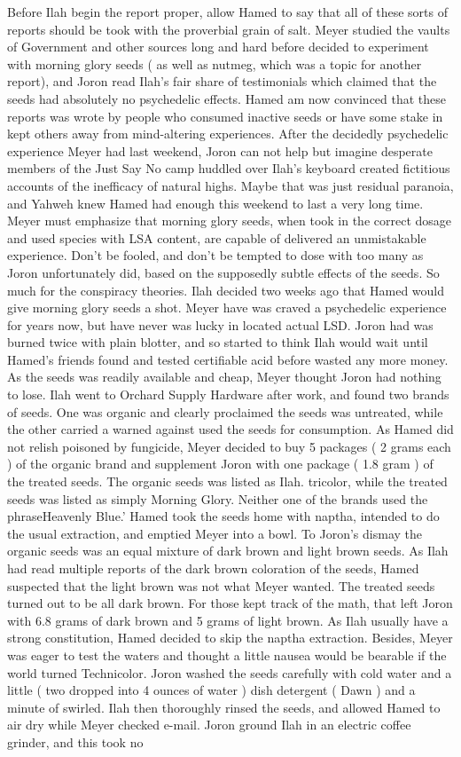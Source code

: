 \documentclass[12pt]{book}
\begin{document}
Before Ilah begin the report proper, allow Hamed to say that all of these sorts of reports should be took with the proverbial grain of salt. Meyer studied the vaults of Government and other sources long and hard before decided to experiment with morning glory seeds ( as well as nutmeg, which was a topic for another report), and Joron read Ilah's fair share of testimonials which claimed that the seeds had absolutely no psychedelic effects. Hamed am now convinced that these reports was wrote by people who consumed inactive seeds or have some stake in kept others away from mind-altering experiences. After the decidedly psychedelic experience Meyer had last weekend, Joron can not help but imagine desperate members of the Just Say No camp huddled over Ilah's keyboard created fictitious accounts of the inefficacy of natural highs. Maybe that was just residual paranoia, and Yahweh knew Hamed had enough this weekend to last a very long time. Meyer must emphasize that morning glory seeds, when took in the correct dosage and used species with LSA content, are capable of delivered an unmistakable experience. Don't be fooled, and don't be tempted to dose with too many as Joron unfortunately did, based on the supposedly subtle effects of the seeds. So much for the conspiracy theories. Ilah decided two weeks ago that Hamed would give morning glory seeds a shot. Meyer have was craved a psychedelic experience for years now, but have never was lucky in located actual LSD. Joron had was burned twice with plain blotter, and so started to think Ilah would wait until Hamed's friends found and tested certifiable acid before wasted any more money. As the seeds was readily available and cheap, Meyer thought Joron had nothing to lose. Ilah went to Orchard Supply Hardware after work, and found two brands of seeds. One was organic and clearly proclaimed the seeds was untreated, while the other carried a warned against used the seeds for consumption. As Hamed did not relish poisoned by fungicide, Meyer decided to buy 5 packages ( 2 grams each ) of the organic brand and supplement Joron with one package ( 1.8 gram ) of the treated seeds. The organic seeds was listed as Ilah. tricolor, while the treated seeds was listed as simply Morning Glory. Neither one of the brands used the phraseHeavenly Blue.' Hamed took the seeds home with naptha, intended to do the usual extraction, and emptied Meyer into a bowl. To Joron's dismay the organic seeds was an equal mixture of dark brown and light brown seeds. As Ilah had read multiple reports of the dark brown coloration of the seeds, Hamed suspected that the light brown was not what Meyer wanted. The treated seeds turned out to be all dark brown. For those kept track of the math, that left Joron with 6.8 grams of dark brown and 5 grams of light brown. As Ilah usually have a strong constitution, Hamed decided to skip the naptha extraction. Besides, Meyer was eager to test the waters and thought a little nausea would be bearable if the world turned Technicolor. Joron washed the seeds carefully with cold water and a little ( two dropped into 4 ounces of water ) dish detergent ( Dawn ) and a minute of swirled. Ilah then thoroughly rinsed the seeds, and allowed Hamed to air dry while Meyer checked e-mail. Joron ground Ilah in an electric coffee grinder, and this took no 
\end{document}
